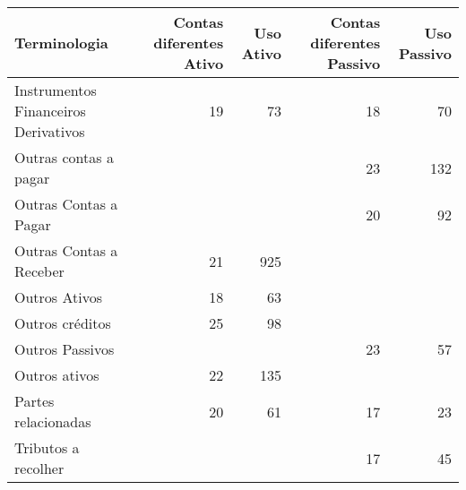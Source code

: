 \begin{table}[ht]
\centering
\begin{tabular}{lrrrr}
  \hline
Terminologia & Contas diferentes Ativo & Uso Ativo & Contas diferentes Passivo & Uso Passivo \\ 
  \hline
Instrumentos Financeiros Derivativos &  19 &  73 &  18 &  70 \\ 
  Outras contas a pagar &  &  &  23 & 132 \\ 
  Outras Contas a Pagar &  &  &  20 &  92 \\ 
  Outras Contas a Receber &  21 & 925 &  &  \\ 
  Outros Ativos &  18 &  63 &  &  \\ 
  Outros créditos &  25 &  98 &  &  \\ 
  Outros Passivos &  &  &  23 &  57 \\ 
  Outros ativos &  22 & 135 &  &  \\ 
  Partes relacionadas &  20 &  61 &  17 &  23 \\ 
  Tributos a recolher &  &  &  17 &  45 \\ 
   \hline
\end{tabular}
\end{table}
